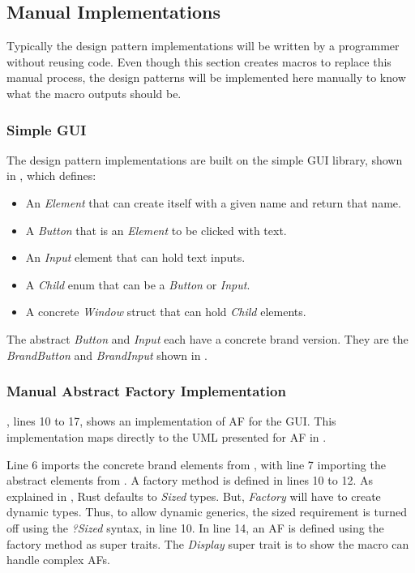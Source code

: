\subsection{Manual Implementations}
\label{sec:manual-implementations}
Typically the design pattern implementations will be written by a programmer without reusing code.
Even though this section creates macros to replace this manual process, the design patterns will be implemented here manually to know what the macro outputs should be.

\subsubsection{Simple GUI}
The design pattern implementations are built on the simple GUI library, shown in , which defines:

\begin{itemize}
	\item An \textit{Element} that can create itself with a given name and return that name.
	\item A \textit{Button} that is an \textit{Element} to be clicked with text.
	\item An \textit{Input} element that can hold text inputs.
	\item A \textit{Child} enum that can be a \textit{Button} or \textit{Input}.
	\item A concrete \textit{Window} struct that can hold \textit{Child} elements.
\end{itemize}

The abstract \textit{Button} and \textit{Input} each have a concrete brand version.
They are the \textit{BrandButton} and \textit{BrandInput} shown in .

\subsubsection{Manual Abstract Factory Implementation}
, lines 10 to 17, shows an implementation of AF for the GUI.
This implementation maps directly to the UML presented for AF in .

Line 6 imports the concrete brand elements from , with line 7 importing the abstract elements from .
A factory method is defined in lines 10 to 12.
As explained in , Rust defaults to \textit{Sized} types.
But, \textit{Factory} will have to create dynamic types.
Thus, to allow dynamic generics, the sized requirement is turned off using the \textit{?Sized} syntax, in line 10.
In line 14, an AF is defined using the factory method as super traits.
The \textit{Display} super trait is to show the macro can handle complex AFs.

